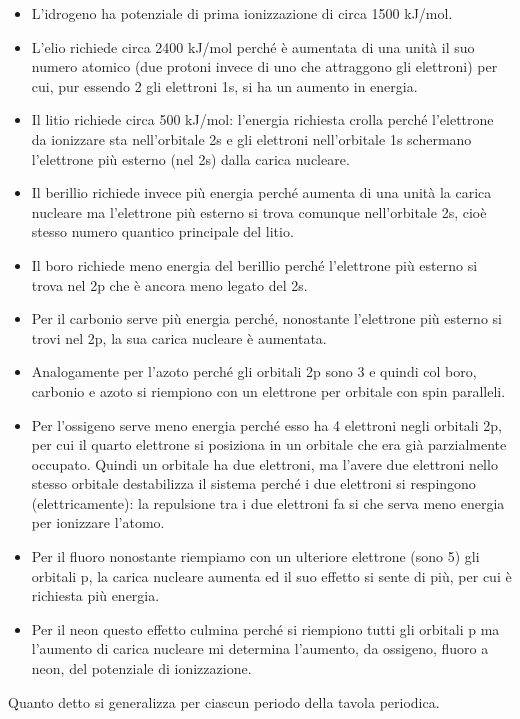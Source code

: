\begin{itemize}
    \item L'idrogeno ha potenziale di prima ionizzazione di circa 1500 kJ/mol.
    \item L'elio richiede circa 2400 kJ/mol perché è aumentata di una unità il suo numero atomico (due protoni invece di uno che attraggono gli elettroni) per cui, pur essendo 2 gli elettroni 1s, si ha un aumento in energia.
    \item Il litio richiede circa 500 kJ/mol: l'energia richiesta crolla perché l'elettrone da ionizzare sta nell'orbitale 2s e gli elettroni nell'orbitale 1s schermano l'elettrone più esterno (nel 2s) dalla carica nucleare.
    \item Il berillio richiede invece più energia perché aumenta di una unità la carica nucleare ma l'elettrone più esterno si trova comunque nell'orbitale 2s, cioè stesso numero quantico principale del litio. 
    \item Il boro richiede meno energia del berillio perché l'elettrone più esterno si trova nel 2p che è ancora meno legato del 2s.
    \item Per il carbonio serve più energia perché, nonostante l'elettrone più esterno si trovi nel 2p, la sua carica nucleare è aumentata.
    \item Analogamente per l'azoto perché gli orbitali 2p sono 3 e quindi col boro, carbonio e azoto si riempiono con un elettrone per orbitale con spin paralleli.
    \item Per l'ossigeno serve meno energia perché esso ha 4 elettroni negli orbitali 2p, per cui il quarto elettrone si posiziona in un orbitale che era già parzialmente occupato. Quindi un orbitale ha due elettroni, ma l'avere due elettroni nello stesso orbitale destabilizza il sistema perché i due elettroni si respingono (elettricamente): la repulsione tra i due elettroni fa si che serva meno energia per ionizzare l'atomo.
    \item Per il fluoro nonostante riempiamo con un ulteriore elettrone (sono 5) gli orbitali p, la carica nucleare aumenta ed il suo effetto si sente di più, per cui è richiesta più energia.
    \item Per il neon questo effetto culmina perché si riempiono tutti gli orbitali p ma l'aumento di carica nucleare mi determina l'aumento, da ossigeno, fluoro a neon, del potenziale di ionizzazione.
\end{itemize}
Quanto detto si generalizza per ciascun periodo della tavola periodica.
